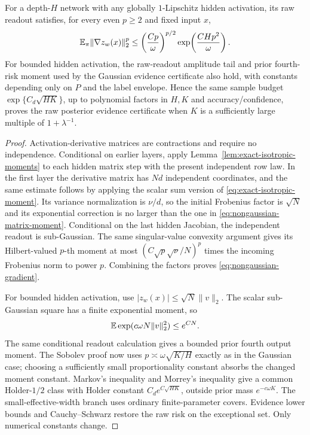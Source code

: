\begin{corollary}
\label{cor:nongaussian-sobolev}
For a depth-$H$ network with any globally $1$-Lipschitz hidden
activation, its raw readout satisfies, for every even $p\ge2$ and
fixed input $x$,
\begin{equation}
 \mathbb E_\pi\|\nabla z_w(x)\|_2^p
 \le\left(\frac{C p}{\omega}\right)^{p/2}
             \exp\!\left(\frac{C H p^2}{\omega}\right).
 \label{eq:nongaussian-gradient}
\end{equation}
For bounded hidden activation, the raw-readout amplitude tail and
prior fourth-risk moment used by the Gaussian evidence certificate
also hold, with constants depending only on $P$ and the label envelope.
Hence the same sample budget
$\exp\{C_d\sqrt{HK}\}$, up to polynomial factors in $H,K$ and
accuracy/confidence, proves the raw posterior evidence certificate
when $K$ is a sufficiently large multiple of $1+\lambda^{-1}$.
\end{corollary}
\begin{proof}
Activation-derivative matrices are contractions and require no
independence. Conditional on earlier layers, apply
Lemma~\ref{lem:exact-isotropic-moments} to each hidden matrix step with the present independent row law.
In the first layer the derivative matrix has $Nd$ independent
coordinates, and the same estimate follows by applying the scalar
sum version of \eqref{eq:exact-isotropic-moment}. Its variance
normalization is $\nu/d$, so the initial Frobenius factor is
$\sqrt N$ and its exponential correction is no larger than the one
in \eqref{eq:nongaussian-matrix-moment}.
Conditional on the last hidden Jacobian, the independent readout is
sub-Gaussian. The same singular-value convexity argument gives its
Hilbert-valued $p$-th moment at most
$(C\sqrt p\sqrt\nu/N)^p$ times the incoming Frobenius norm to power
$p$. Combining the factors proves \eqref{eq:nongaussian-gradient}.

For bounded hidden activation, use
$|z_w(x)|\le\sqrt N\|v\|_2$.
The scalar sub-Gaussian square has a finite exponential moment, so
\[
 \mathbb E\exp(c\omega N\|v\|_2^2)\le e^{CN}.
\]
The same conditional readout calculation gives a bounded prior
fourth output moment. The Sobolev proof now uses
$p\asymp\omega\sqrt{K/H}$ exactly as in the Gaussian case; choosing
a sufficiently small proportionality constant absorbs the changed
moment constant. Markov's inequality and Morrey's inequality give
a common Holder-$1/2$ class with Holder constant
$C_d e^{C\sqrt{HK}}$, outside prior mass $e^{-c\omega K}$.
The small-effective-width branch uses ordinary finite-parameter
covers. Evidence lower bounds and Cauchy--Schwarz restore the raw
risk on the exceptional set. Only numerical constants change.
\end{proof}

